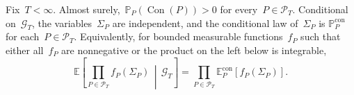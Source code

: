 \documentclass[EJP,preprint,NODS,nobera]{ejpecp}
\newcommand{\pP}{\mathbb{P}}
\newcommand{\E}{\mathbb{E}}
\newcommand{\CE}[2]{\E\Cb{#1\,\middle|\,#2}}
\newcommand{\bb}[1]{\left(#1\right)}
\newcommand{\Cb}[1]{\left[#1\right]}
\newcommand{\chg}[1]{{\color{changegreen}#1}}
\begin{document}
\begin{lemma}
\label{thm:patch-factorization}
Fix~$T<\infty$. \chg{Almost surely,~$\pP_P\bb{\operatorname{Con}(P)}>0$
for every~$P\in\mathcal P_T$.} Conditional on~$\mathcal G_T$, the variables~$\Sigma_P$ are
independent, and the conditional law of~$\Sigma_P$ is
$\pP_P^{\mathrm{con}}$ for each~$P\in\mathcal P_T$. Equivalently, for
bounded measurable functions~$f_P$ such that either all~$f_P$ are nonnegative
or the product on the left below is integrable,
\begin{equation}
\label{eq:patch-factorization}
\CE{
\prod_{P\in\mathcal P_T}f_P\bb{\Sigma_P}
}{\mathcal G_T}
=
\prod_{P\in\mathcal P_T}
\E_P^{\mathrm{con}}\Cb{f_P\bb{\Sigma_P}}.
\end{equation}
\end{lemma}
\end{document}

